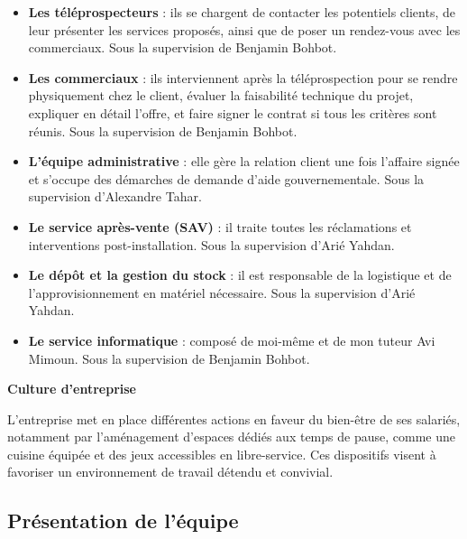 \begin{itemize}
    \item \textbf{Les téléprospecteurs} : ils se chargent de contacter les potentiels clients, de leur présenter les services proposés, ainsi que de poser un rendez-vous avec les commerciaux. Sous la supervision de Benjamin Bohbot.\vspace{0.3cm}
    \item \textbf{Les commerciaux} : ils interviennent après la téléprospection pour se rendre physiquement chez le client, évaluer la faisabilité technique du projet, expliquer en détail l’offre, et faire signer le contrat si tous les critères sont réunis. Sous la supervision de Benjamin Bohbot.\vspace{0.3cm}
    \item \textbf{L’équipe administrative} : elle gère la relation client une fois l’affaire signée et s’occupe des démarches de demande d’aide gouvernementale. Sous la supervision d’Alexandre Tahar.\vspace{0.3cm}
    \item \textbf{Le service après-vente (SAV)} : il traite toutes les réclamations et interventions post-installation. Sous la supervision d’Arié Yahdan.\vspace{0.3cm}
    \item \textbf{Le dépôt et la gestion du stock} : il est responsable de la logistique et de l’approvisionnement en matériel nécessaire. Sous la supervision d’Arié Yahdan.\vspace{0.3cm}
    \item \textbf{Le service informatique} : composé de moi-même et de mon tuteur Avi Mimoun. Sous la supervision de Benjamin Bohbot.\vspace{0.3cm}
\end{itemize} \vspace{0.3cm}

\textbf{Culture d’entreprise}\vspace{0.3cm}

L’entreprise met en place différentes actions en faveur du bien-être de ses salariés, notamment par l’aménagement d’espaces dédiés aux temps de pause, comme une cuisine équipée et des jeux accessibles en libre-service. Ces dispositifs visent à favoriser un environnement de travail détendu et convivial.
\subsection{Présentation de l’équipe}

